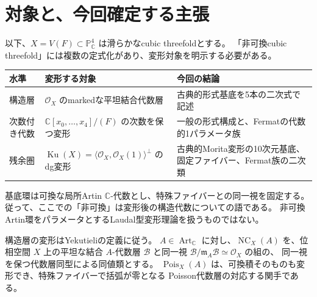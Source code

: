 \documentclass[a4paper,11pt]{ltjsarticle}
\newcommand{\mathscr}{\mathcal}
\theoremstyle{definition}
\newcommand{\CC}{\mathbb C}
\newcommand{\OO}{\mathcal O}
\newcommand{\PP}{\mathbb P}
\newcommand{\Ku}{\operatorname{Ku}}
\newcommand{\Art}{\operatorname{Art}_{\CC}}
\newcommand{\NC}{\operatorname{NC}}
\newcommand{\Pois}{\operatorname{Pois}}
\newcommand{\frakm}{\mathfrak m}
\begin{document}
\section{対象と、今回確定する主張}

以下、$X=V(F)\subset\PP^4_{\CC}$ は滑らかなcubic threefoldとする。
「非可換cubic threefold」には複数の定式化があり、変形対象を明示する必要がある。

\begin{center}
\small
\begin{tabular}{p{}p{}p{}}
\toprule
水準 & 変形する対象 & 今回の結論\\
\midrule
構造層 &
$\OO_X$ のmarkedな平坦結合代数層 &
古典的形式基底を5本の二次式で記述\\
次数付き代数 &
$\CC[x_0,\ldots,x_4]/(F)$ の次数を保つ変形 &
一般の形式構成と、Fermatの代数的1パラメータ族\\
残余圏 &
$\Ku(X)=\langle\OO_X,\OO_X(1)\rangle^\perp$ のdg変形 &
古典的Morita変形の10次元基底、固定ファイバー、Fermat族の二次類\\
\bottomrule
\end{tabular}
\end{center}

基底環は可換な局所Artin $\CC$-代数とし、特殊ファイバーとの同一視を固定する。
従って、ここでの「非可換」は変形後の構造代数についての語である。
非可換Artin環をパラメータとするLaudal型変形理論を扱うものではない。

構造層の変形はYekutieliの定義\cite[Definitions 2.7--2.8]{Yek}に従う。
$A\in\Art$ に対し、$\NC_X(A)$ を、位相空間 $X$ 上の平坦な結合 $A$-代数層
$\mathscr B$ と同一視 $\mathscr B/\frakm_A\mathscr B\simeq\OO_X$ の組の、
同一視を保つ代数層同型による同値類とする。
$\Pois_X(A)$ は、可換積そのものも変形でき、特殊ファイバーで括弧が零となる
Poisson代数層の対応する関手である。
\end{document}
